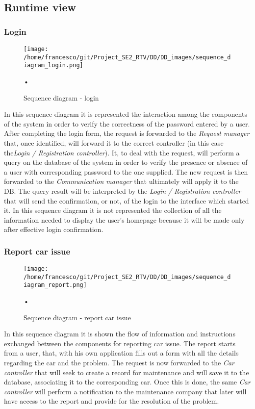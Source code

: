 \documentclass[10pt, a4paper,titlepage]{article}
\begin{document}
\subsection{Runtime view}
\subsubsection{Login}
\begin{figure}[h]
\begin{center}
\texttt{[image: /home/francesco/git/Project\_SE2\_RTV/DD/DD\_images/sequence\_diagram\_login.png]}
\caption{Sequence diagram - login}
\label{fig:sequence_diagram_login}
\end{center}•
\end{figure}
In this sequence diagram it is represented the interaction among the components of the system in order to verify the correctness of the password entered by a user.
After completing the login form, the request is forwarded to the \emph{Request manager} that, once identified, will forward it to the correct controller (in this case the\emph{Login / Registration controller}).
It, to deal with the request, will perform a query on the database of the system in order to verify the presence or absence of a user with corresponding password to the one supplied.
The new request is then forwarded to the \emph{Communication manager} that ultimately will apply it to the DB.
The query result will be interpreted by the \emph{Login / Registration controller} that will send the confirmation, or not, of the login to the interface which started it.
In this sequence diagram it is not represented the collection of all the information needed to display the user's homepage because it will be made only after effective login confirmation.
\subsubsection{Report car issue}
\begin{figure}[h]
\begin{center}
\texttt{[image: /home/francesco/git/Project\_SE2\_RTV/DD/DD\_images/sequence\_diagram\_report.png]}
\caption{Sequence diagram - report car issue}
\label{fig:sequence_diagram_report}
\end{center}•
\end{figure}
In this sequence diagram it is shown the flow of information and instructions exchanged between the components for reporting car issue.
The report starts from a user, that, with his own application fills out a form with all the details regarding the car and the problem.
The request is now forwarded to the \emph{Car controller} that will seek to create a record for maintenance and will save it to the database, associating it to the corresponding car.
Once this is done, the same \emph{Car controller} will perform a notification to the maintenance company that later will have access to the report and provide for the resolution of the problem.
\end{document}
